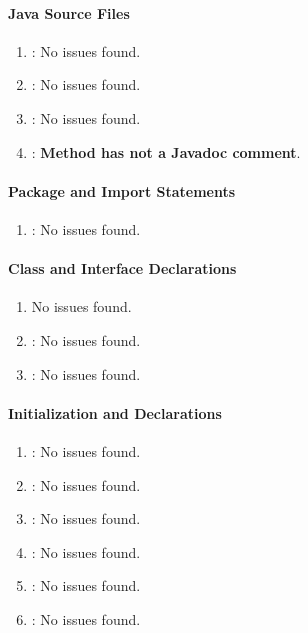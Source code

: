 \paragraph{Java Source Files} %
\label{par:java_source_files}

\begin{enumerate} [resume]
	\item \emph{\checkT}: No issues found.
	\item \emph{\checkU}: No issues found.
	\item \emph{\checkV}: No issues found.
	\item \emph{\checkW}: \textbf{Method has not a Javadoc comment}.
\end{enumerate}

\paragraph{Package and Import Statements} %
\label{par:package_and_import_statements}

\begin{enumerate} [resume]
	\item \emph{\checkX}: No issues found.
\end{enumerate}

\paragraph{Class and Interface Declarations} %
\label{par:class_and_interface_declarations}

\begin{enumerate} [resume]
	\item \emph{\checkY}No issues found.
	\item \emph{\checkZ}: No issues found.
	\item \emph{\checkAA}: No issues found.
\end{enumerate}

\paragraph{Initialization and Declarations} %
\label{par:initialization_and_declarations}

\begin{enumerate} [resume]
	\item \emph{\checkAB}: No issues found.
	\item \emph{\checkAC}: No issues found.
	\item \emph{\checkAD}: No issues found.
	\item \emph{\checkAE}: No issues found.
	\item \emph{\checkAF}: No issues found.
	\item \emph{\checkAG}: No issues found.
\end{enumerate}

